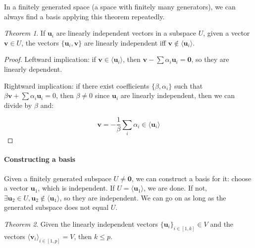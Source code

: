 \documentclass[12pt,a4paper]{report}
\numberwithin{equation}{section}
\theoremstyle{definition}
\theoremstyle{remark}
\newtheorem{theorem}{Theorem}[section]
\begin{document}
In a finitely generated space (a space with finitely many generators), we can always find a basis applying this theorem repeatedly.

\begin{theorem}
If $\mathbf{u}_i$ are linearly independent vectors in a subspace $U$, given a vector $\mathbf{v} \in U$, the vectors $\lbrace \mathbf{u}_i, \mathbf{v}\rbrace$ are linearly independent iff $\mathbf{v} \notin \langle \mathbf{u}_i \rangle$.
\end{theorem}

\begin{proof}
Leftward implication: if $\mathbf{v} \in \langle \mathbf{u}_i \rangle$, then $\mathbf{v}- \sum \alpha_i \mathbf{u}_i = \mathbf{0}$, so they are linearly dependent.

Rightward implication: if there exist coefficients $\lbrace \beta, \alpha_i \rbrace$ such that $\beta \mathbf{v} + \sum \alpha_i \mathbf{u}_i = 0$, then $\beta \neq 0$ since $\mathbf{u}_i$ are linearly independent, then we can divide by $\beta$ and:

\begin{equation}
\mathbf{v} = -\frac 1\beta \sum_i \alpha_i \in \langle \mathbf{u}_i\rangle
\end{equation}
\end{proof}

\paragraph{Constructing a basis}

Given a finitely generated subspace $U\neq \mathbf{0}$, we can construct a basis for it: choose a vector $\mathbf{u}_1$, which is independent. If $U = \langle \mathbf{u}_1\rangle$, we are done. If not, $\exists \mathbf{u}_2 \in U, \mathbf{u}_2 \notin \langle \mathbf{u}_1\rangle$, so they are independent. We can go on as long as the generated subspace does not equal $U$.

\begin{theorem}
Given the linearly independent vectors $\lbrace \mathbf{u}_i\rbrace_{i \in [1, k]} \in V$ and the vectors $\langle \mathbf{v}_i\rangle_{i \in [1, p]} = V$, then $k \leq p$.
\end{theorem}
\end{document}
